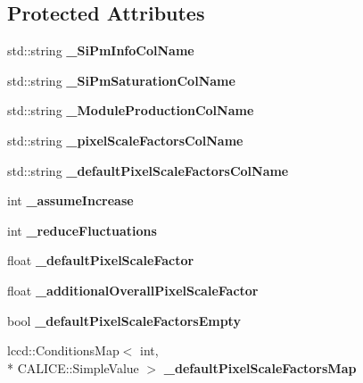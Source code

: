 \subsection*{Protected Attributes}
\begin{DoxyCompactItemize}
\item 
std\-::string {\bfseries \-\_\-\-Si\-Pm\-Info\-Col\-Name}\label{classCALICE_1_1SiPmPropertiesProcessor_acb6749fb1dcb670ca6206a0fc5478196}

\item 
std\-::string {\bfseries \-\_\-\-Si\-Pm\-Saturation\-Col\-Name}\label{classCALICE_1_1SiPmPropertiesProcessor_a66c56f04af769b028268647ddeffe705}

\item 
std\-::string {\bfseries \-\_\-\-Module\-Production\-Col\-Name}\label{classCALICE_1_1SiPmPropertiesProcessor_a46c6cf33232fba705301d00d02088adc}

\item 
std\-::string {\bfseries \-\_\-pixel\-Scale\-Factors\-Col\-Name}\label{classCALICE_1_1SiPmPropertiesProcessor_a2ef504d7d9c26e1303b99de4da217a41}

\item 
std\-::string {\bfseries \-\_\-default\-Pixel\-Scale\-Factors\-Col\-Name}\label{classCALICE_1_1SiPmPropertiesProcessor_a19a7832e60bdff54a927cbbc53b1cca4}

\item 
int {\bfseries \-\_\-assume\-Increase}\label{classCALICE_1_1SiPmPropertiesProcessor_a506a0e660344a9b36912b6eae69b6f94}

\item 
int {\bfseries \-\_\-reduce\-Fluctuations}\label{classCALICE_1_1SiPmPropertiesProcessor_ac5cc7412d5336f3f2e911b2aaf212649}

\item 
float {\bfseries \-\_\-default\-Pixel\-Scale\-Factor}\label{classCALICE_1_1SiPmPropertiesProcessor_a90bcbbe027b24839e1968c9b84a555af}

\item 
float {\bfseries \-\_\-additional\-Overall\-Pixel\-Scale\-Factor}\label{classCALICE_1_1SiPmPropertiesProcessor_afad2b42ffbb0391e63a263686e6f5f94}

\item 
bool {\bfseries \-\_\-default\-Pixel\-Scale\-Factors\-Empty}\label{classCALICE_1_1SiPmPropertiesProcessor_aad80ef59255bbbacf9d31637d642b045}

\item 
lccd\-::\-Conditions\-Map$<$ int, \\*
C\-A\-L\-I\-C\-E\-::\-Simple\-Value $>$ {\bfseries \-\_\-default\-Pixel\-Scale\-Factors\-Map}\label{classCALICE_1_1SiPmPropertiesProcessor_ab881fc07e0db31700f84de9a851d4070}


\end{DoxyCompactItemize}
